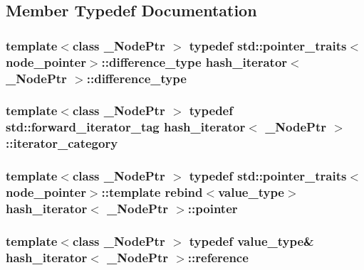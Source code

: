 \subsection{Member Typedef Documentation}
\hypertarget{classhash__iterator_a594d7f0375d027ee463e7ab5d72cfe50}{}
\subsubsection[{difference\+\_\+type}]{\setlength{\rightskip}{0pt plus 5cm}template$<$class \+\_\+\+Node\+Ptr $>$ typedef std\+::pointer\+\_\+traits$<$node\+\_\+pointer$>$\+::{\bf difference\+\_\+type} {\bf hash\+\_\+iterator}$<$ \+\_\+\+Node\+Ptr $>$\+::{\bf difference\+\_\+type}}\label{classhash__iterator_a594d7f0375d027ee463e7ab5d72cfe50}
\hypertarget{classhash__iterator_ac7f22b21b9e812be82ff6e2d22aa5b22}{}
\subsubsection[{iterator\+\_\+category}]{\setlength{\rightskip}{0pt plus 5cm}template$<$class \+\_\+\+Node\+Ptr $>$ typedef std\+::forward\+\_\+iterator\+\_\+tag {\bf hash\+\_\+iterator}$<$ \+\_\+\+Node\+Ptr $>$\+::{\bf iterator\+\_\+category}}\label{classhash__iterator_ac7f22b21b9e812be82ff6e2d22aa5b22}
\hypertarget{classhash__iterator_a7e43a9eb7cc16f1e13c47e3b76762bb7}{}
\subsubsection[{pointer}]{\setlength{\rightskip}{0pt plus 5cm}template$<$class \+\_\+\+Node\+Ptr $>$ typedef std\+::pointer\+\_\+traits$<$node\+\_\+pointer$>$\+::template rebind$<${\bf value\+\_\+type}$>$ {\bf hash\+\_\+iterator}$<$ \+\_\+\+Node\+Ptr $>$\+::{\bf pointer}}\label{classhash__iterator_a7e43a9eb7cc16f1e13c47e3b76762bb7}
\hypertarget{classhash__iterator_aaa355159b91ef00385b0c4256e9a9eaf}{}
\subsubsection[{reference}]{\setlength{\rightskip}{0pt plus 5cm}template$<$class \+\_\+\+Node\+Ptr $>$ typedef {\bf value\+\_\+type}\& {\bf hash\+\_\+iterator}$<$ \+\_\+\+Node\+Ptr $>$\+::{\bf reference}}\label{classhash__iterator_aaa355159b91ef00385b0c4256e9a9eaf}
\hypertarget{classhash__iterator_a2fe8b2e7a76ef651b9e3dd75e176d708}{}
